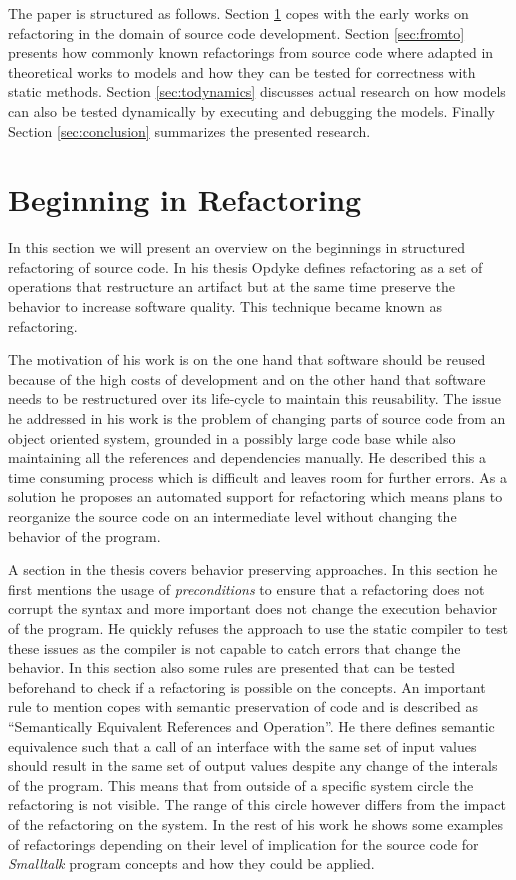 \documentclass{llncs}
\begin{document}
The paper is structured as follows. Section \ref{sec:beginning} copes with the early works on refactoring in the domain
of source code development. Section \ref{sec:fromto} presents how commonly known refactorings from source code where
adapted in theoretical works to models and how they can be tested for correctness with static methods. Section 
\ref{sec:todynamics} discusses actual research on how models can also be tested dynamically by executing and debugging 
the models. Finally Section \ref{sec:conclusion} summarizes the presented research.

\section{Beginning in Refactoring}
\label{sec:beginning}

In this section we will present an overview on the beginnings in structured refactoring of source code. In his thesis
Opdyke \cite{mast:REFOOF} defines refactoring as a set of operations that restructure an artifact but at the same time
preserve the behavior to increase software quality. This technique became known as refactoring.

The motivation of his work is on the one hand that software should be reused because of the high costs of development
and on the other hand that software needs to be restructured over its life-cycle to maintain this reusability. The issue
he addressed in his work is the problem of changing parts of source code from an object oriented system, grounded in a
possibly large code base while also maintaining all the references and dependencies manually. He described this a time
consuming process which is difficult and leaves room for further errors. As a solution he proposes an automated support
for refactoring which means plans to reorganize the source code on an intermediate level without changing the behavior
of the program.

A section in the thesis covers behavior preserving approaches. In this section he first mentions the usage of
\textit{preconditions} to ensure that a refactoring does not corrupt the syntax and more important does not change the
execution behavior of the program. He quickly refuses the approach to use the static compiler to test these issues as
the compiler is not capable to catch errors that change the behavior. In this section also some rules are presented that
can be tested beforehand to check if a refactoring is possible on the concepts. An important rule to mention copes with
semantic preservation of code and is described as ``Semantically Equivalent References and Operation''. He there defines
semantic equivalence such that a call of an interface with the same set of input values should result in the same set of
output values despite any change of the interals of the program. This means that from outside of a specific system
circle the refactoring is not visible. The range of this circle however differs from the impact of the refactoring on
the system. In the rest of his work he shows some examples of refactorings depending on their level of implication for
the source code for \textit{Smalltalk} program concepts and how they could be applied.
\end{document}
